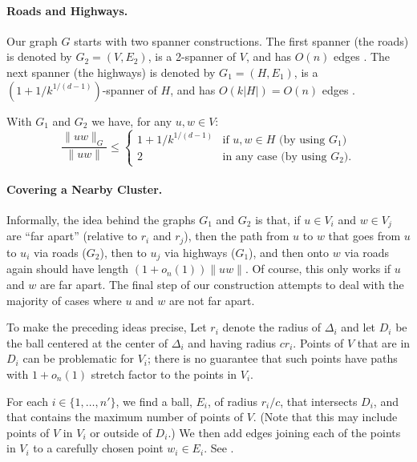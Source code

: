\documentclass{patmorin}
\begin{document}
\paragraph{Roads and Highways.}

Our graph $G$ starts with two spanner constructions.
The first spanner (the roads) is denoted by
$G_2=(V,E_2)$, is a 2-spanner of $V$, and has $O(n)$ edges
\cite{callahan.kosaraju:faster,salowe:constructing,vaidya:sparse}.
The next spanner (the highways) is denoted by $G_1=(H,E_1)$, is a
$(1+1/k^{1/(d-1)})$-spanner of $H$, and has $O(k|H|)=O(n)$ edges
\cite{carmi.smid:optimal,ruppert.seidel:approximating}.

With $G_1$ and $G_2$ we have, for any $u,w\in V$:
\[
   \frac{\|uw\|_G}{\|uw\|} \le \begin{cases}
         1+1/k^{1/(d-1)} & \text{if $u,w\in H$ (by using $G_1$)} \\
         2 & \text{in any case (by using $G_2$).}
       \end{cases}
\]

\paragraph{Covering a Nearby Cluster.}

Informally, the idea behind the graphs $G_1$ and $G_2$ is that, if
$u\in V_i$ and $w\in V_j$ are ``far apart'' (relative to $r_i$
and $r_j$), then the path from $u$ to $w$ that goes from $u$ to $u_i$
via roads ($G_2$), then to $u_j$ via highways ($G_1$), and then onto
$w$ via roads again should have length $(1+o_n(1))\|uw\|$.  Of course,
this only works if $u$ and $w$ are far apart.  The final step of
our construction attempts to deal with the majority of cases where $u$
and $w$ are not far apart.

To make the preceding ideas precise, Let $r_i$ denote the radius
of $\Delta_i$ and let $D_i$ be the ball centered at the center of
$\Delta_i$ and having radius $cr_i$.  Points of $V$ that are in $D_i$
can be problematic for $V_i$; there is no guarantee that such points
have paths with $1+o_n(1)$ stretch factor to the points in $V_i$.

For each $i\in\{1,\ldots,n'\}$, we find a ball, $E_i$, of radius $r_i/c$,
that intersects $D_i$, and that contains the maximum number of points
of $V$.  (Note that this may include points of $V$ in $V_i$ or outside
of $D_i$.)  We then add edges joining each of the points in $V_i$ to
a carefully chosen point $w_i\in E_i$.  See .
\end{document}
